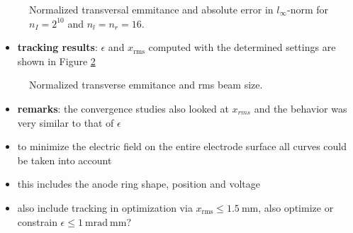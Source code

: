 \begin{center}
\begin{figure}[H]
   \begin{subfigure}{0.4\textwidth}
      
   \end{subfigure}
   \qquad \qquad \qquad
   \begin{subfigure}{0.4\textwidth}
      
   \end{subfigure}
   \caption{Normalized transversal emmitance and absolute error in $l_\infty$-norm for $n_I=2^{10}$ and $n_l=n_r=16$.}
   \label{fig:sc_cvg_I}
\end{figure}
\end{center}

\begin{itemize}
   \item \textbf{tracking results}: $\epsilon$ and $x_\mathrm{rms}$ computed with the determined settings are shown in Figure \ref{fig:astra_res}
\end{itemize}

\begin{center}
\begin{figure}[H]
   \begin{subfigure}{0.4\textwidth}
      
   \end{subfigure}
   \qquad \qquad \qquad
   \begin{subfigure}{0.4\textwidth}
      
   \end{subfigure}
   \caption{Normalized transverse emmitance and rms beam size.}
   \label{fig:astra_res}
\end{figure}
\end{center}

\begin{itemize}
   \item \textbf{remarks}: the convergence studies also looked at $x_{rms}$ and the behavior was very similar to that of $\epsilon$\\

   \item to minimize the electric field on the entire electrode surface all curves could be taken into account
   \item this includes the anode ring shape, position and voltage
   \item also include tracking in optimization via $x_\mathrm{rms} \leq 1.5\ \mathrm{mm}$, also optimize or constrain $\epsilon \leq 1\ \mathrm{mrad\ mm}$?
\end{itemize}
